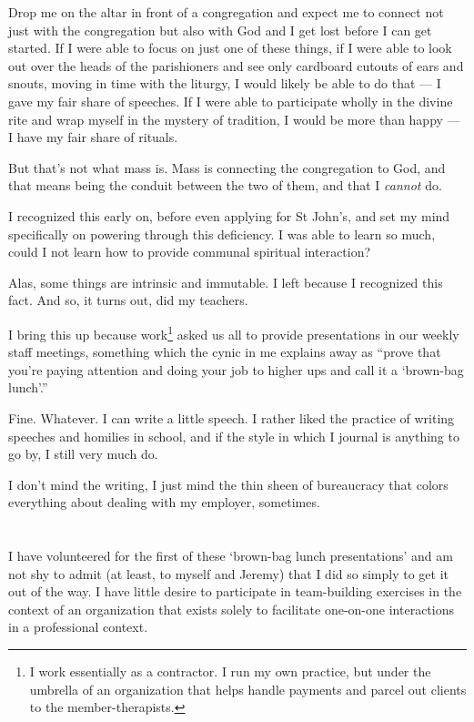 Drop me on the altar in front of a congregation and expect me to connect not just with the congregation but also with God and I get lost before I can get started. If I were able to focus on just one of these things, if I were able to look out over the heads of the parishioners and see only cardboard cutouts of ears and snouts, moving in time with the liturgy, I would likely be able to do that --- I gave my fair share of speeches. If I were able to participate wholly in the divine rite and wrap myself in the mystery of tradition, I would be more than happy --- I have my fair share of rituals.

But that's not what mass is. Mass is connecting the congregation to God, and that means being the conduit between the two of them, and that I \emph{cannot} do.

I recognized this early on, before even applying for St John's, and set my mind specifically on powering through this deficiency. I was able to learn so much, could I not learn how to provide communal spiritual interaction?

Alas, some things are intrinsic and immutable. I left because I recognized this fact. And so, it turns out, did my teachers.

I bring this up because work\footnote{I work essentially as a contractor. I run my own practice, but under the umbrella of an organization that helps handle payments and parcel out clients to the member-therapists.} asked us all to provide presentations in our weekly staff meetings, something which the cynic in me explains away as ``prove that you're paying attention and doing your job to higher ups and call it a `brown-bag lunch'.''

Fine. Whatever. I can write a little speech. I rather liked the practice of writing speeches and homilies in school, and if the style in which I journal is anything to go by, I still very much do.

I don't mind the writing, I just mind the thin sheen of bureaucracy that colors everything about dealing with my employer, sometimes.

\section{}

I have volunteered for the first of these `brown-bag lunch presentations' and am not shy to admit (at least, to myself and Jeremy) that I did so simply to get it out of the way. I have little desire to participate in team-building exercises in the context of an organization that exists solely to facilitate one-on-one interactions in a professional context.

